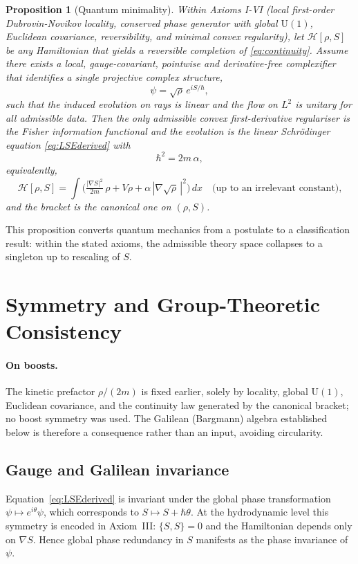 \documentclass[11pt,a4paper]{article}
\numberwithin{equation}{section}
\theoremstyle{thmcompact}
\newtheorem{proposition}[theorem]{Proposition}
\theoremstyle{remark}
\begin{document}
\begin{proposition}[Quantum minimality]\label{thm:quantum-minimality}
	Within Axioms I-VI (local first-order Dubrovin-Novikov locality, conserved phase generator with global $\mathrm{U}(1)
$, Euclidean covariance, reversibility, and minimal convex regularity), let $\mathcal H[\rho,S]$ be any Hamiltonian that yields a reversible completion of \eqref{eq:continuity}. 
	Assume there exists a \emph{local, gauge-covariant, pointwise and derivative-free} complexifier that identifies a single projective complex structure,
	\[
	\psi=\sqrt{\rho}\,e^{iS/\hbar},
	\]
	such that the induced evolution on rays is linear and the flow on $L^{2}$ is unitary for all admissible data. Then the only admissible convex first-derivative regulariser is the Fisher information functional and the evolution is the linear Schrödinger equation \eqref{eq:LSEderived} with
	\[
	\hbar^{2}=2m\,\alpha,
	\]
	equivalently,
	\[
	\mathcal H[\rho,S]=\int\!\Big(\tfrac{|\nabla S|^{2}}{2m}\,\rho+V\rho+\alpha\,|\nabla\!\sqrt{\rho}\,|^{2}\Big)\,dx
	\quad\text{(up to an irrelevant constant),}
	\]
	and the bracket is the canonical one on $(\rho,S)$.
\end{proposition}

This proposition converts quantum mechanics from a postulate to a classification result: within the stated axioms, the admissible theory space collapses to a singleton up to rescaling of $S$.

\section{Symmetry and Group-Theoretic Consistency}\label{sec:symmetry}

\paragraph{On boosts.}
The kinetic prefactor $\rho/(2m)$ is fixed earlier, solely by locality, global $\mathrm{U}(1)
$, Euclidean covariance, and the continuity law generated by the canonical bracket; no boost symmetry was used.  The Galilean (Bargmann) algebra established below is therefore a consequence rather than an input, avoiding circularity.

\subsection{Gauge and Galilean invariance}

Equation~\eqref{eq:LSEderived} is invariant under the global phase transformation $\psi\mapsto e^{i\theta}\psi$, which corresponds to $S\mapsto S+\hbar\theta$.
At the hydrodynamic level this symmetry is encoded in Axiom~III: $\{S,S\}=0$ and the Hamiltonian depends only on $\nabla S$.
Hence global phase redundancy in $S$ manifests as the phase invariance of $\psi$.
\end{document}
